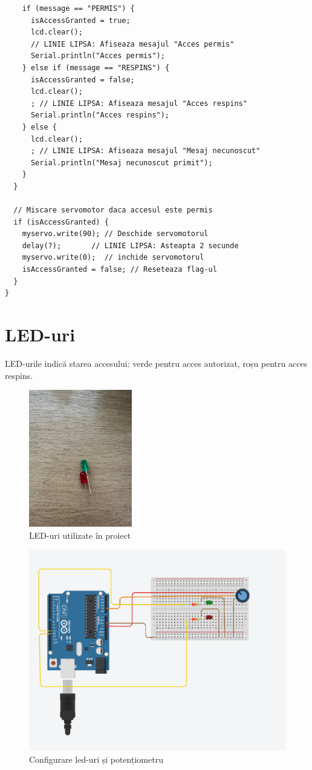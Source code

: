 \documentclass{report}
\begin{document}
\begin{itemize}
\begin{lstlisting}
    if (message == "PERMIS") {
      isAccessGranted = true;
      lcd.clear();
      // LINIE LIPSA: Afiseaza mesajul "Acces permis"
      Serial.println("Acces permis");
    } else if (message == "RESPINS") {
      isAccessGranted = false;
      lcd.clear();
      ; // LINIE LIPSA: Afiseaza mesajul "Acces respins"
      Serial.println("Acces respins");
    } else {
      lcd.clear();
      ; // LINIE LIPSA: Afiseaza mesajul "Mesaj necunoscut"
      Serial.println("Mesaj necunoscut primit");
    }
  }

  // Miscare servomotor daca accesul este permis
  if (isAccessGranted) {
    myservo.write(90); // Deschide servomotorul
    delay(?);       // LINIE LIPSA: Asteapta 2 secunde
    myservo.write(0);  // inchide servomotorul
    isAccessGranted = false; // Reseteaza flag-ul
  }
}

    \end{lstlisting}
\end{itemize}


\newpage
\vspace*{1cm}
\section{LED-uri}
LED-urile indică starea accesului: verde pentru acces autorizat, roșu pentru acces respins.

\begin{figure}[H]
    \centering
    \includegraphics[width=0.4\textwidth]{leds.jpg}
    \caption{LED-uri utilizate în proiect}
    \label{fig:leds}
\end{figure}

\begin{figure}[H]
    \centering
    \includegraphics[width=0.5\linewidth]{led+pot.png}
    \caption{Configurare led-uri și potențiometru}
    \label{fig:configleds}
\end{figure}
\newpage
\vspace*{1cm}
\end{document}
